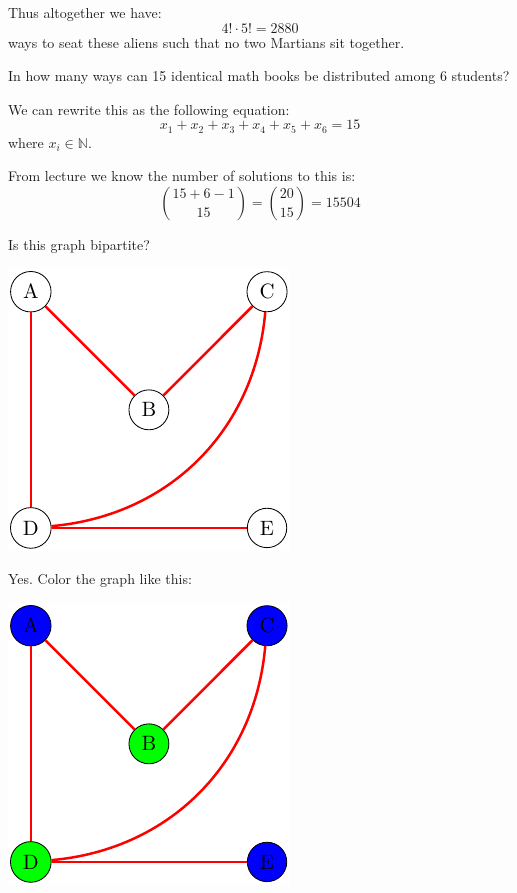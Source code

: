 \documentclass[addpoints]{exam}
\newcommand{\naturals}{\mathbb{N}}
\begin{document}
\begin{questions}
\begin{solution}
    Thus altogether we have:
    \[
      4! \cdot 5! = 2880
    \]
    ways to seat these aliens such that no two Martians sit together.
  \end{solution}

  \question In how many ways can 15 identical math books be distributed among 6 students?
  \vspace*{\fill}
  \begin{solution}
    We can rewrite this as the following equation:
    \[
      x_1 + x_2 + x_3 + x_4 + x_5 + x_6 = 15
    \]
    where $x_i \in\naturals$.

    From lecture we know the number of solutions to this is:
    \[
      \binom{15+6-1}{15} = \binom{20}{15} = 15504
    \]
  \end{solution}

  \question Is this graph bipartite?
  \begin{center}
    \includegraphics{graph1}
  \end{center}
  \vspace*{\fill}
  \begin{solution}
    Yes. Color the graph like this:
    \begin{center}
      \includegraphics{graph1colored}
    \end{center}


\end{solution}
\end{questions}
\end{document}
